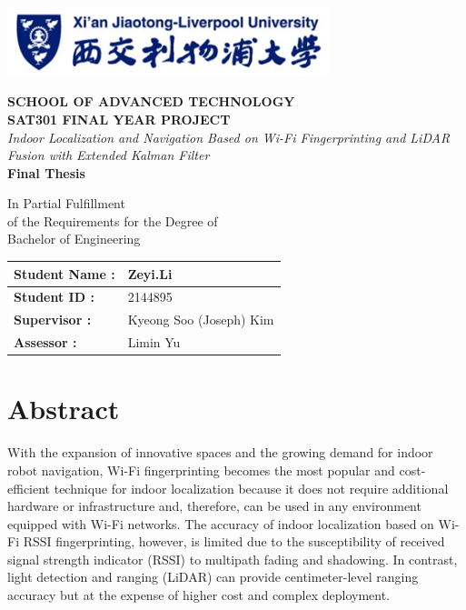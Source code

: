 \documentclass[12pt,a4paper]{article}
\numberwithin{equation}{section}
\begin{document}
  \onehalfspacing %

\begin{titlepage}
  \centering%
  \vspace*{-1cm}%
  \includegraphics[width=0.7\textwidth]{images/xjtlu.png}
  \vspace{1cm}%

  {\large \textbf{SCHOOL OF ADVANCED TECHNOLOGY}}\\[0.3cm]%
  {\large \textbf{SAT301 FINAL YEAR PROJECT}}\\[3cm]%
  {\Large \textit{Indoor Localization and Navigation Based on Wi-Fi
      Fingerprinting and LiDAR Fusion with Extended Kalman Filter}}\\[2cm]%
  {\LARGE \textbf{Final Thesis}}\\[4cm]%

\begin{center}
  \large
  In Partial Fulfillment\\
  of the Requirements for the Degree of\\
  Bachelor of Engineering
\end{center}

\vfill
\begin{table}[H]
  \centering
  \begin{tabular}{|l|l|}
    \hline
    \textbf{Student Name :} & Zeyi.Li \\ \hline
    \textbf{Student ID :}   & 2144895 \\ \hline
    \textbf{Supervisor :}   & Kyeong Soo (Joseph) Kim \\ \hline
    \textbf{Assessor :}     & Limin Yu\\ \hline
  \end{tabular}
\end{table}
\end{titlepage}


\section*{Abstract}
With the expansion of innovative spaces and the growing demand for indoor robot
navigation, Wi-Fi fingerprinting becomes the most popular and cost-efficient
technique for indoor localization because it does not require additional
hardware or infrastructure and, therefore, can be used in any environment
equipped with Wi-Fi networks. The accuracy of indoor localization based on Wi-Fi
RSSI fingerprinting, however, is limited due to the susceptibility of received
signal strength indicator (RSSI) to multipath fading and shadowing. In contrast,
light detection and ranging (LiDAR) can provide centimeter-level ranging
accuracy but at the expense of higher cost and complex deployment.
\end{document}
